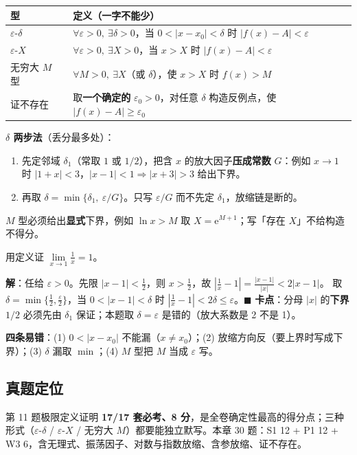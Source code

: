 \documentclass[11pt,a4paper]{ctexart}
\newcommand{\eps}{\varepsilon}
\newcommand{\abs}[1]{\left\lvert #1\right\rvert}
\newcommand{\ee}{\mathrm{e}}
\begin{document}
\begin{center}
\begin{tabular}{@{}p{2.7cm}p{12.5cm}@{}}
\toprule
\textbf{型} & \textbf{定义（一字不能少）} \\
\midrule
$\eps$-$\delta$ & $\forall\eps>0,\ \exists\delta>0$，当 $0<\abs{x-x_0}<\delta$ 时 $\abs{f(x)-A}<\eps$ \\
$\eps$-$X$ & $\forall\eps>0,\ \exists X>0$，当 $x>X$ 时 $\abs{f(x)-A}<\eps$ \\
无穷大 $M$ 型 & $\forall M>0,\ \exists X$（或 $\delta$），使 $x>X$ 时 $f(x)>M$ \\
证不存在 & 取\textbf{一个确定的} $\eps_0>0$，对任意 $\delta$ 构造反例点，使 $\abs{f(x)-A}\ge\eps_0$ \\
\bottomrule
\end{tabular}
\end{center}

\textbf{$\delta$ 两步法}（丢分最多处）：
\begin{enumerate}
\item 先定邻域 $\delta_1$（常取 $1$ 或 $1/2$），把含 $x$ 的放大因子\textbf{压成常数} $G$：例如 $x\to1$ 时 $\abs{1+x}<3$，$\abs{x-1}<1\Rightarrow \abs{x+3}>3$ 给出下界。
\item 再取 $\delta=\min\{\delta_1,\ \eps/G\}$。只写 $\eps/G$ 而不先定 $\delta_1$，放缩链是断的。
\end{enumerate}
$M$ 型必须给出\textbf{显式}下界，例如 $\ln x>M$ 取 $X=\ee^{M+1}$；写「存在 $X$」不给构造不得分。

\begin{keypoint}[例题精讲 $\cdot$ $\eps$-$\delta$ 的完整书写]
用定义证 $\lim\limits_{x\to1}\frac1x=1$。

\noindent\textbf{解}：任给 $\eps>0$。先限 $\abs{x-1}<\frac12$，则 $x>\frac12$，故
$\abs{\frac1x-1}=\frac{\abs{x-1}}{\abs{x}}<2\abs{x-1}$。
取 $\delta=\min\{\frac12,\frac{\eps}{2}\}$，当 $0<\abs{x-1}<\delta$ 时 $\abs{\frac1x-1}<2\delta\le\eps$。$\blacksquare$
\textbf{卡点}：分母 $\abs{x}$ 的\textbf{下界} $1/2$ 必须先由 $\delta_1$ 保证；本题取 $\delta=\eps$ 是错的（放大系数是 2 不是 1）。
\end{keypoint}

\noindent\textbf{四条易错}：(1) $0<\abs{x-x_0}$ 不能漏（$x\neq x_0$）；(2) 放缩方向反（要上界时写成下界）；(3) $\delta$ 漏取 $\min$；(4) $M$ 型把 $M$ 当成 $\eps$ 写。

\subsection{真题定位}
第 11 题极限定义证明 \textbf{17/17 套必考、8 分}，是全卷确定性最高的得分点；三种形式（$\eps$-$\delta$ / $\eps$-$X$ / 无穷大 $M$）都要能独立默写。本章 30 题：S1 12 + P1 12 + W3 6，含无理式、振荡因子、对数与指数放缩、含参放缩、证不存在。
\end{document}
